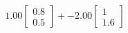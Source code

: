 \documentclass[preview]{standalone}
\begin{document}
\begin{align*}
1.00 \begin{bmatrix} 0.8 \\ 0.5 \end{bmatrix} + -2.00 \begin{bmatrix} 1 \\ 1.6 \end{bmatrix}
\end{align*}
\end{document}
